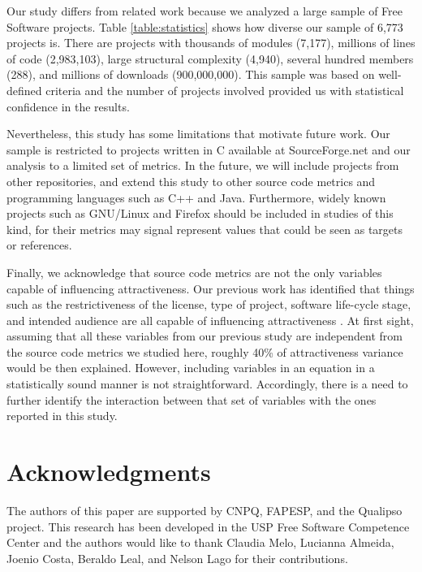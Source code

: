 \documentclass[conference]{IEEEtran}
\begin{document}
Our study differs from related work because we analyzed a large
sample of Free Software projects. Table \ref {table:statistics} shows how diverse our sample of
6,773 projects is. There are projects with thousands of modules (7,177),
millions of lines of code (2,983,103), large structural complexity (4,940),
several hundred members (288), and millions of downloads (900,000,000).
This sample was based on well-defined criteria and the number of projects
involved provided us with statistical confidence in the results.

Nevertheless, this study has some limitations that motivate future work.
%
Our sample is restricted to projects written in C available at
SourceForge.net and our analysis to a limited set of metrics.
In the future, we will include projects from other repositories, and extend
this study to other source code metrics and programming languages such as C++
and Java. 
%
Furthermore, widely known projects such as GNU/Linux and Firefox should be
included in studies of this kind, for their metrics may signal represent values
that could be seen as targets or references.

Finally, we acknowledge that source code metrics are not the only
variables capable of influencing attractiveness.
%
Our previous work has identified that things such as the restrictiveness of
the license, type of project, software life-cycle stage, and intended audience
are all capable of influencing attractiveness \cite{Santos2010}.
%
At first sight, assuming that all these variables from our previous study are
independent from the source code metrics we studied here, roughly 40\% of attractiveness variance would be then explained.
%
However, including variables in an equation in a statistically sound manner is not
straightforward. Accordingly, there is a need to further identify the interaction
between that set of variables with the ones reported in this study.

\section*{Acknowledgments}
The authors of this paper are supported by CNPQ, FAPESP, and the Qualipso project.
This research has been developed in the USP Free Software Competence Center and the
authors would like to thank Claudia Melo, Lucianna Almeida, Joenio Costa,
Beraldo Leal, and Nelson Lago for their contributions.



\end{document}

